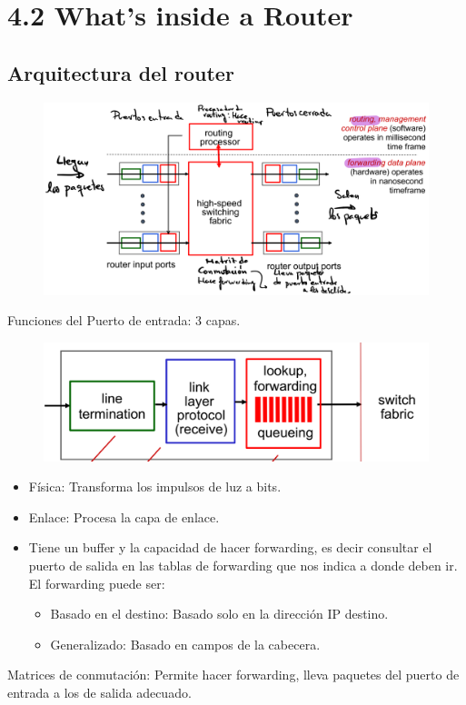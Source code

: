 \documentclass[12pt, twoside, openright]{report} %
\begin{document}
\section{4.2 What's inside a Router}
\subsection{Arquitectura del router}
\begin{figure}[H]
	{\includegraphics[scale=.25]{Untitled 22.png}}
\end{figure}
    Funciones del Puerto de entrada: 3 capas.
	\begin{figure}[H]
		{\includegraphics[scale=.25]{Untitled 23.png}}
	\end{figure}
    \begin{itemize}
    \item
      Física: Transforma los impulsos de luz a bits.
    \item
      Enlace: Procesa la capa de enlace.
    \item
      Tiene un buffer y la capacidad de hacer forwarding, es decir
      consultar el puerto de salida en las tablas de forwarding que nos
      indica a donde deben ir. El forwarding puede ser:

      \begin{itemize}
      \item
        Basado en el destino: Basado solo en la dirección IP destino.
      \item
        Generalizado: Basado en campos de la cabecera.
      \end{itemize}
    \end{itemize}
\pagebreak
	Matrices de conmutación: Permite hacer forwarding, lleva paquetes
    del puerto de entrada a los de salida adecuado.
\end{document}
